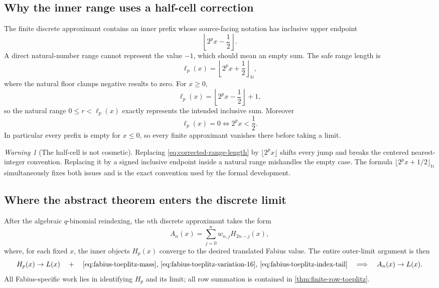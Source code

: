 \documentclass[11pt,oneside]{article}
\theoremstyle{definition}
\theoremstyle{remark}
\newtheorem{warning}[theorem]{Warning}
\newcommand{\N}{\mathbb N}
\begin{document}
\subsection{Why the inner range uses a half-cell correction}

The finite discrete approximant contains an inner prefix whose source-facing notation has
inclusive upper endpoint
\begin{equation}
 \left\lfloor2^px-\frac12\right\rfloor.
 \label{eq:inclusive-upper-bound}
\end{equation}
A direct natural-number range cannot represent the value $-1$, which should mean an empty
sum.  The safe range length is
\begin{equation}
 \ell_p(x)=\left\lfloor2^px+\frac12\right\rfloor_{\N},
 \label{eq:corrected-range-length}
\end{equation}
where the natural floor clamps negative results to zero.  For $x\ge0$,
\begin{equation}
 \ell_p(x)=\left\lfloor2^px-\frac12\right\rfloor+1,
 \label{eq:range-length-inclusive}
\end{equation}
so the natural range $0\le r<\ell_p(x)$ exactly represents the intended inclusive sum.
Moreover
\begin{equation}
 \ell_p(x)=0
 \iff 2^px<\frac12.
 \label{eq:range-length-zero-iff}
\end{equation}
In particular every prefix is empty for $x\le0$, so every finite approximant vanishes there
before taking a limit.

\begin{warning}[The half-cell is not cosmetic]
Replacing \eqref{eq:corrected-range-length} by $\lfloor2^px\rfloor$ shifts every jump and
breaks the centered nearest-integer convention.  Replacing it by a signed inclusive endpoint
inside a natural range mishandles the empty case.  The formula
$\lfloor2^px+1/2\rfloor_{\N}$ simultaneously fixes both issues and is the exact convention
used by the formal development.
\end{warning}

\subsection{Where the abstract theorem enters the discrete limit}

After the algebraic $q$-binomial reindexing, the $n$th discrete approximant takes the form
\begin{equation}
 A_n(x)=\sum_{j=0}^{n}w_{n,j}H_{2n-j}(x),
 \label{eq:discrete-limit-toeplitz-form}
\end{equation}
where, for each fixed $x$, the inner objects $H_p(x)$ converge to the desired translated
Fabius value.  The entire outer-limit argument is then
\begin{equation*}
 H_p(x)\to L(x)
 \quad+\quad
 \text{\eqref{eq:fabius-toeplitz-mass}, \eqref{eq:fabius-toeplitz-variation-16},
 \eqref{eq:fabius-toeplitz-index-tail}}
 \quad\Longrightarrow\quad
 A_n(x)\to L(x).
\end{equation*}
All Fabius-specific work lies in identifying $H_p$ and its limit; all row summation is
contained in \cref{thm:finite-row-toeplitz}.
\end{document}

